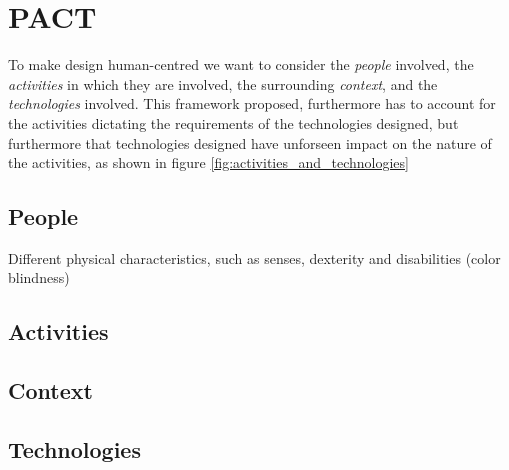 \section{PACT} \label{sec:pact} 
To make design human-centred we want to consider the \emph{people} involved, the \emph{activities} in which they are involved, the surrounding \emph{context}, and the \emph{technologies} involved. This framework proposed, furthermore has to account for the activities dictating the requirements of the technologies designed, but furthermore that technologies designed have unforseen impact on the nature of the activities, as shown in figure \ref{fig:activities_and_technologies} \cite[p. 25-26]{benyon_14}



\subsection{People}
     Different physical characteristics, such as senses, dexterity and disabilities (color blindness)
     
\subsection{Activities}

\subsection{Context}

\subsection{Technologies}
